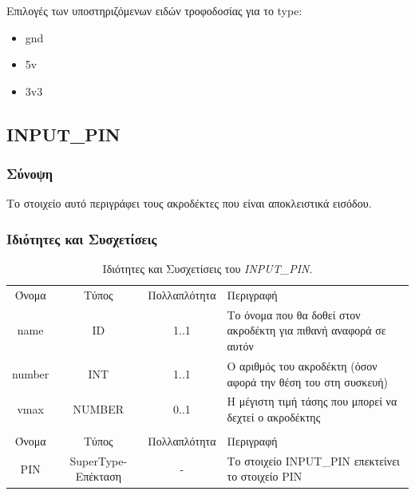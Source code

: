 \noindent Επιλογές των υποστηριζόμενων ειδών τροφοδοσίας για το type:

\begin{itemize}
	\item gnd
	\item 5v
	\item 3v3
\end{itemize}

\subsection{INPUT\_PIN}
\label{subsec:input_pin}

\subsubsection*{Σύνοψη}

\noindent Το στοιχείο αυτό περιγράφει τους ακροδέκτες που είναι αποκλειστικά εισόδου.

\subsubsection*{Ιδιότητες και Συσχετίσεις}

\begin{table}[H]
	\begin{center}
		\begin{tabular}{ | c | c | c| m{5.5cm} | }
			\hline
			\rowcolor{Gray}
			\multicolumn{4}{|c|}{\textbf{Ιδιότητες}}\\
			\hline
			\rowcolor{Gray}
			Όνομα & Τύπος & Πολλαπλότητα & Περιγραφή \\
			\hline
			name & ID & 1..1 & Το όνομα που θα δοθεί στον ακροδέκτη για πιθανή αναφορά σε αυτόν \\
			\hline
			number & INT & 1..1 & Ο αριθμός του ακροδέκτη (όσον αφορά την θέση του στη συσκευή) \\
			\hline
			vmax & NUMBER & 0..1 & Η μέγιστη τιμή τάσης που μπορεί να δεχτεί ο ακροδέκτης \\
			\hline
			\rowcolor{Gray}
			\multicolumn{4}{|c|}{\textbf{Συσχετίσεις}}\\
			\hline
			\rowcolor{Gray}
			Όνομα & Τύπος & Πολλαπλότητα & Περιγραφή \\
			\hline
			PIN & SuperType-Επέκταση & - &  Το στοιχείο INPUT\_PIN επεκτείνει το στοιχείο PIN \\
			\hline
		\end{tabular}
		\caption{Ιδιότητες και Συσχετίσεις του \textit{INPUT\_PIN}.}
		\label{tab:input_pin}
	\end{center}
\end{table}

